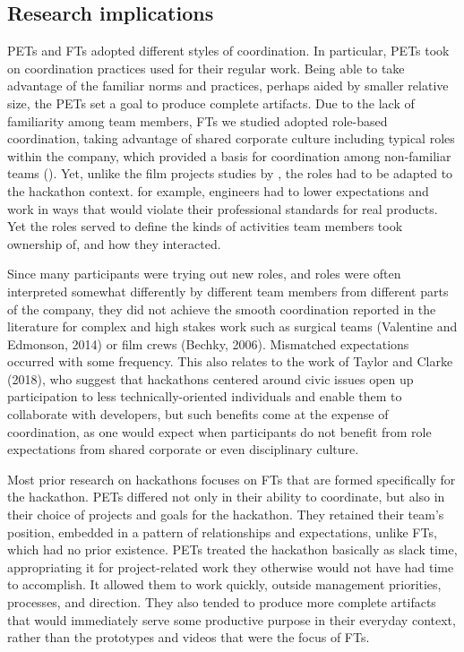 \documentclass{hcij}
\begin{document}
\subsection{Research implications}
PETs and FTs adopted different styles of coordination. In particular, PETs took on coordination practices used for their regular work. Being able to take advantage of the familiar norms and practices, perhaps aided by smaller relative size, the PETs set a goal to produce complete artifacts. Due to the lack of familiarity among team members, FTs we studied adopted role-based coordination, taking advantage of shared corporate culture including typical roles within the company, which provided a basis for coordination among non-familiar teams (\cite{bechky2006gaffers}). Yet, unlike the film projects studies by \citep{bechky2006gaffers}, the roles had to be adapted to the hackathon context. for example, engineers had to lower expectations and work in ways that would violate their professional standards for real products. Yet the roles served to define the kinds of activities team members took ownership of, and how they interacted.

Since many participants were trying out new roles, and roles were often interpreted somewhat differently by different team members from different parts of the company, they did not achieve the smooth coordination reported in the literature for complex and high stakes work such as surgical teams (Valentine and Edmonson, 2014) or film crews (Bechky, 2006). Mismatched expectations occurred with some frequency. This also relates to the work of Taylor and Clarke (2018), who suggest that hackathons centered around civic issues open up participation to less technically-oriented individuals and enable them to collaborate with developers, but such benefits come at the expense of coordination, as one would expect when participants do not benefit from role expectations from shared corporate or even disciplinary culture.

Most prior research on hackathons focuses on FTs that are formed specifically for the hackathon. PETs differed not only in their ability to coordinate, but also in their choice of projects and goals for the hackathon. They retained their team’s position, embedded in a pattern of relationships and expectations, unlike FTs, which had no prior existence. PETs treated the hackathon basically as slack time, appropriating it for project-related work they otherwise would not have had time to accomplish. It allowed them to work quickly, outside management priorities, processes, and direction. They also tended to produce more complete artifacts that would immediately serve some productive purpose in their everyday context, rather than the prototypes and videos that were the focus of FTs.
\end{document}
